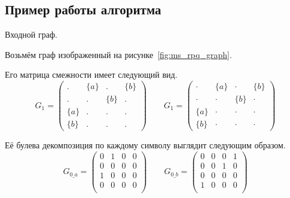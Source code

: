 \subsection{Пример работы алгоритма}
\begin{marginfigure}
    \caption{Входной граф.}
    \label{fig:ms_rpq_graph}
    \begin{center}
    \end{center}
\end{marginfigure}
Возьмём граф изображенный на рисунке~\ref{fig:ms_rpq_graph}.


Его матрица смежности имеет следующий вид.
\[
    G_1 =
    \begin{pmatrix}
        .     & \{a\} & .     & \{b\} \\
        .     & .     & \{b\} & .     \\
        \{a\} & .     & .     & .     \\
        \{b\} & .     & .     & .
    \end{pmatrix}
    \qquad
    G_1 =
    \begin{pmatrix}
        \cdot & \{a\} & \cdot & \{b\} \\
        \cdot & \cdot & \{b\} & \cdot \\
        \{a\} & \cdot & \cdot & \cdot \\
        \{b\} & \cdot & \cdot & \cdot
    \end{pmatrix}
\]

Её булева декомпозиция по каждому символу выглядит следующим образом.
\[
    G_{0\_a} = \begin{pmatrix}
        0 & 1 & 0 & 0 \\
        0 & 0 & 0 & 0 \\
        1 & 0 & 0 & 0 \\
        0 & 0 & 0 & 0 \\
    \end{pmatrix} \qquad
    G_{0\_b} = \begin{pmatrix}
        0 & 0 & 0 & 1 \\
        0 & 0 & 1 & 0 \\
        0 & 0 & 0 & 0 \\
        1 & 0 & 0 & 0 \\
    \end{pmatrix}
\]

